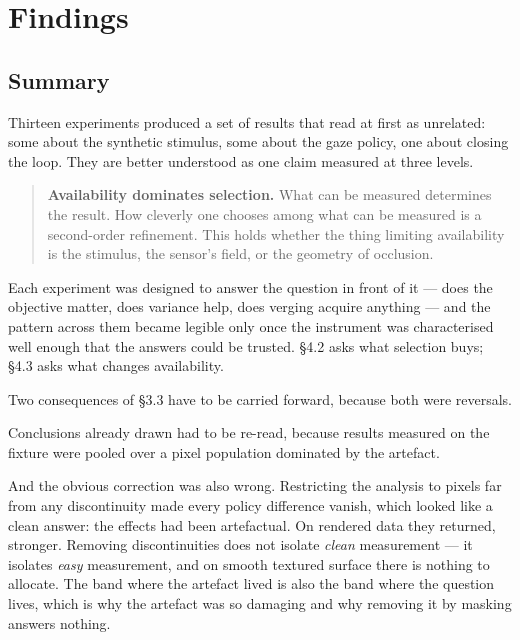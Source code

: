 \section{Findings}

\subsection{Summary}

Thirteen experiments produced a set of results that read at first as unrelated:
some about the synthetic stimulus, some about the gaze policy, one about closing
the loop. They are better understood as one claim measured at three levels.

\begin{quote}
\textbf{Availability dominates selection.} What can be measured determines the
result. How cleverly one chooses among what can be measured is a second-order
refinement. This holds whether the thing limiting availability is the stimulus,
the sensor's field, or the geometry of occlusion.
\end{quote}

Each experiment was designed to answer the question in front of it --- does the
objective matter, does variance help, does verging acquire anything --- and the
pattern across them became legible only once the instrument was characterised
well enough that the answers could be trusted. \S4.2 asks what selection buys;
\S4.3 asks what changes availability.

Two consequences of \S3.3 have to be carried forward, because both were
reversals.

Conclusions already drawn had to be re-read, because results measured on the
fixture were pooled over a pixel population dominated by the artefact.

And the obvious correction was also wrong. Restricting the analysis to pixels
far from any discontinuity made every policy difference vanish, which looked
like a clean answer: the effects had been artefactual. On rendered data they
returned, stronger. Removing discontinuities does not isolate \emph{clean}
measurement --- it isolates \emph{easy} measurement, and on smooth textured
surface there is nothing to allocate. The band where the artefact lived is also
the band where the question lives, which is why the artefact was so damaging and
why removing it by masking answers nothing.

